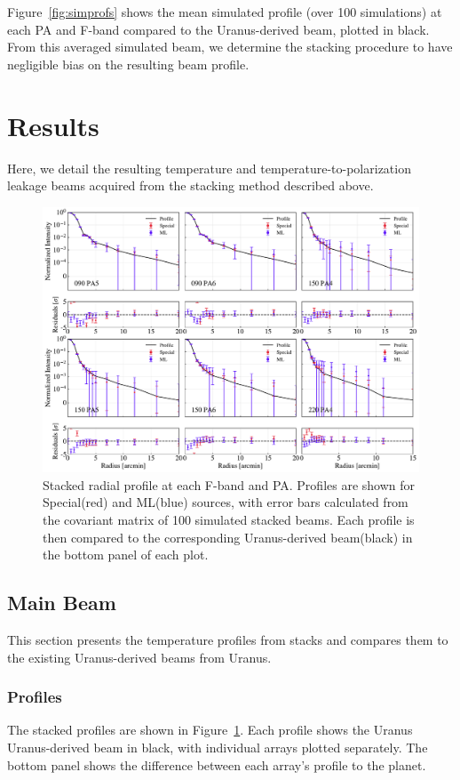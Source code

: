 Figure~\ref{fig:simprofs} shows the mean simulated profile (over 100 simulations) at each PA and F-band compared to the Uranus-derived beam, plotted in black.  From this averaged simulated beam, we determine the stacking procedure to have negligible bias on the resulting beam profile.

\section{Results}
\label{sec:act_results}
Here, we detail the resulting temperature and temperature-to-polarization leakage beams acquired from the stacking method described above. 

\begin{figure}[t]
    \centering
    \includegraphics[width=\textwidth]{Figures/profiles_noP_15.pdf}
    \caption{Stacked radial profile at each F-band and PA.  Profiles are shown for Special(red) and ML(blue) sources, with error bars calculated from the covariant matrix of 100 simulated stacked beams.  Each profile is then compared to the corresponding Uranus-derived beam(black) in the bottom panel of each plot.
    }
    \label{fig:profiles}
\end{figure}

\subsection{Main Beam}
\label{subsec:mainbeam}
This section presents the temperature profiles from stacks and compares them to the existing Uranus-derived beams from Uranus. 
\subsubsection{Profiles}
\label{subsubsec:profiles}
The stacked profiles are shown in Figure~\ref{fig:profiles}.  Each profile shows the Uranus Uranus-derived beam in black, with individual arrays plotted separately.  The bottom panel shows the difference between each array's profile to the planet.
